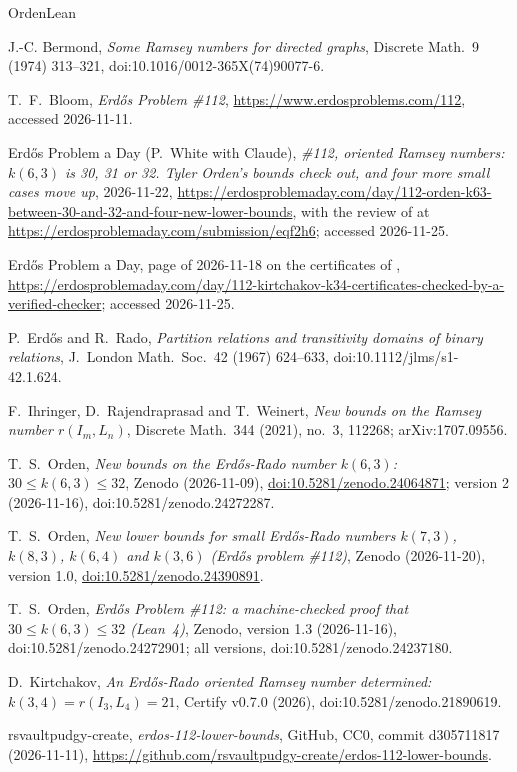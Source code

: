 \documentclass[11pt]{amsart}
\theoremstyle{plain}
\theoremstyle{definition}
\theoremstyle{remark}
\begin{document}
\begin{thebibliography}{OrdenLean}

 J.-C. Bermond, \emph{Some Ramsey numbers for directed graphs}, Discrete
Math.\ 9 (1974) 313--321, doi:10.1016/0012-365X(74)90077-6.

 T.~F.~Bloom, \emph{Erd\H{o}s Problem \#112},
\url{https://www.erdosproblems.com/112}, accessed 2026-11-11.

 Erd\H{o}s Problem a Day (P.~White with Claude), \emph{\#112, oriented Ramsey
numbers: $k(6,3)$ is 30, 31 or 32. Tyler Orden's bounds check out, and four more small cases move
up}, 2026-11-22,
\url{https://erdosproblemaday.com/day/112-orden-k63-between-30-and-32-and-four-new-lower-bounds},
with the review of \cite{Orden2} at \url{https://erdosproblemaday.com/submission/eqf2h6}; accessed
2026-11-25.

 Erd\H{o}s Problem a Day, page of 2026-11-18 on the certificates of
\cite{PartG},
\url{https://erdosproblemaday.com/day/112-kirtchakov-k34-certificates-checked-by-a-verified-checker};
accessed 2026-11-25.

 P.~Erd\H{o}s and R.~Rado, \emph{Partition relations and transitivity
domains of binary relations}, J.\ London Math.\ Soc.\ 42 (1967) 624--633,
doi:10.1112/jlms/s1-42.1.624.

 F.~Ihringer, D.~Rajendraprasad and T.~Weinert, \emph{New bounds on the
Ramsey number $r(I_m,L_n)$}, Discrete Math.\ 344 (2021), no.~3, 112268; arXiv:1707.09556.

 T.~S.~Orden, \emph{New bounds on the Erd\H{o}s-Rado number $k(6,3)$:
$30\leq k(6,3)\leq 32$}, Zenodo (2026-11-09),
\href{https://doi.org/10.5281/zenodo.24064871}{doi:10.5281/zenodo.24064871}; version 2
(2026-11-16), doi:10.5281/zenodo.24272287.

 T.~S.~Orden, \emph{New lower bounds for small Erd\H{o}s-Rado numbers
$k(7,3)$, $k(8,3)$, $k(6,4)$ and $k(3,6)$ (Erd\H{o}s problem \#112)}, Zenodo (2026-11-20), version
1.0, \href{https://doi.org/10.5281/zenodo.24390891}{doi:10.5281/zenodo.24390891}.

 T.~S.~Orden, \emph{Erd\H{o}s Problem \#112: a machine-checked proof
that $30\leq k(6,3)\leq 32$ (Lean~4)}, Zenodo, version 1.3 (2026-11-16),
doi:10.5281/zenodo.24272901; all versions, doi:10.5281/zenodo.24237180.

 D.~Kirtchakov, \emph{An Erd\H{o}s-Rado oriented Ramsey number determined:
$k(3,4)=r(I_3,L_4)=21$}, Certify v0.7.0 (2026), doi:10.5281/zenodo.21890619.

 rsvaultpudgy-create, \emph{erdos-112-lower-bounds}, GitHub, CC0, commit
d305711817 (2026-11-11), \url{https://github.com/rsvaultpudgy-create/erdos-112-lower-bounds}.

\end{thebibliography}
\end{document}
